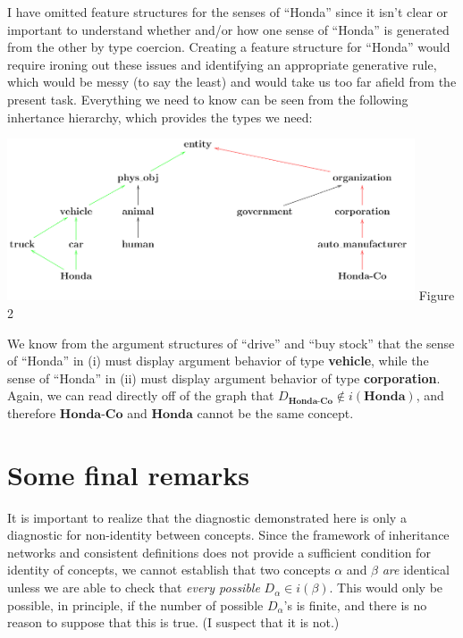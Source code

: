 I have omitted feature structures for the senses of ``Honda'' since it isn't clear or important to understand whether and/or how one sense of ``Honda'' is generated from the other by type coercion. Creating a feature structure for ``Honda'' would require ironing out these issues and identifying an appropriate generative rule, which would be messy (to say the least) and would take us too far afield from the present task. Everything we need to know can be seen from the following inhertance hierarchy, which provides the types we need:
\begin{center}
\includegraphics[width=4.75in]{InheritanceNetwork2}
\vspace{3mm}
Figure 2
\end{center}

We know from the argument structures of ``drive'' and ``buy stock'' that the sense of ``Honda'' in (i) must display argument behavior of type {\bf vehicle}, while the sense of ``Honda'' in (ii) must display argument behavior of type {\bf corporation}. Again, we can read directly off of the graph that $D_\textbf{Honda-Co}\notin i(\textbf{Honda})$, and therefore $\textbf{Honda-Co}$ and $\textbf{Honda}$ cannot be the same concept.

\section{Some final remarks}

It is important to realize that the diagnostic demonstrated here is only a diagnostic for non-identity between concepts. Since the framework of inheritance networks and consistent definitions does not provide a sufficient condition for identity of concepts, we cannot establish that two concepts $\alpha$ and $\beta$ \emph{are} identical unless we are able to check that \emph{every possible} $D_\alpha\in i(\beta)$. This would only be possible, in principle, if the number of possible $D_\alpha$'s is finite, and there is no reason to suppose that this is true. (I suspect that it is not.)

